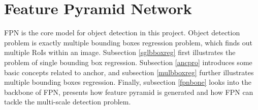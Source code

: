 \section{Feature Pyramid Network}\label{modfpn}
FPN \cite{fpn} is the core model for object detection in this project. Object detection problem is exactly multiple bounding boxes regression problem, which finds out multiple RoIs within an image. Subsection \ref{sglbboxreg} first illustrates the problem of single bounding box regression. Subsection \ref{ancpro} introduces some basic concepts related to anchor, and subsection \ref{mulbboxreg} further illustrates multiple bounding boxes regression. Finally, subsection \ref{fpnbone} looks into the backbone of FPN, presents how feature pyramid is generated and how FPN can tackle the multi-scale detection problem.

